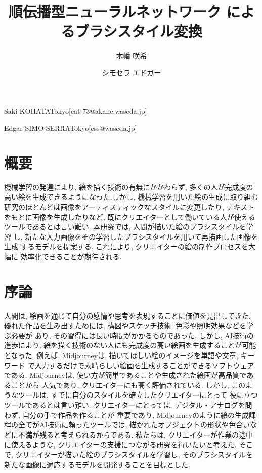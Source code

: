 \documentclass[MIRU,submit,uplatex]{miru2023j}
\begin{document}
\title{順伝播型ニューラルネットワーク によるブラシスタイル変換}


 \author{木幡 咲希}{Saki KOHATA}{Tokyo}[cat-73@akane.waseda.jp]
 \author{シモセラ エドガー}{Edgar SIMO-SERRA}{Tokyo}[ess@waseda.jp]

\maketitle

\section*{概要}
機械学習の発達により, 絵を描く技術の有無にかかわらず, 多くの人が完成度の
高い絵を生成できるようになった.しかし, 機械学習を用いた絵の生成に取り組む
研究のほとんどは画像をアーティスティックなスタイルに変更したり, テキスト
をもとに画像を生成したりなど, 既にクリエイターとして働いている人が使える
ツールであるとは言い難い. 本研究では, 人間が描いた絵のブラシスタイルを学習
し, 新たな入力画像をその学習したブラシスタイルを用いて再描画した画像を生成
するモデルを提案する. これにより, クリエイターの絵の制作プロセスを大幅に
効率化できることが期待される.
 

\section{序論}
人間は, 絵画を通じて自分の感情や思考を表現することに価値を見出してきた.
優れた作品を生み出すためには, 構図やスケッチ技術, 色彩や照明効果などを学ぶ必要が
あり, その習得には長い時間がかかるものであった. しかし, AI技術の進歩により, 
絵を描く技術のない人にも完成度の高い絵画を生成することが可能となった.
例えば, Midjourney\cite{Midjourney}は, 描いてほしい絵のイメージを単語や文章, キーワード
で入力するだけで素晴らしい絵画を生成することができるソフトウェアである. 
Midjourneyは, 使い方が簡単であることや生成された絵画が高品質であることから
人気であり, クリエイターにも高く評価されている.
しかし, このようなツールは, すでに自分のスタイルを確立したクリエイターにとって
役に立つツールであるとは言い難い. 
クリエイターにとっては, デジタル・アナログを問わず, 自分の手で作品を作ることが
重要であり, Midjourneyのように絵の生成課程の全てがAI技術に頼ったツールでは, 
描かれたオブジェクトの形状や色合いなどに不満が残ると考えられるからである.
私たちは, クリエイターが作業の途中に使えるような, 
クリエイターの支援につながる研究を行いたいと考えた.
そこで, クリエイターが描いた絵のブラシスタイルを学習し, そのブラシスタイルを
新たな画像に適応するモデルを開発することを目標とした. 
\end{document}

